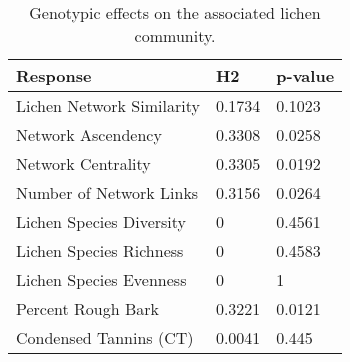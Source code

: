 \begin{table}[ht]
\centering
\begin{tabular}{lll}
  \hline
Response & H2 & p-value \\ 
  \hline
Lichen Network Similarity & 0.1734 & 0.1023 \\ 
  Network Ascendency & 0.3308 & 0.0258 \\ 
  Network Centrality & 0.3305 & 0.0192 \\ 
  Number of Network Links & 0.3156 & 0.0264 \\ 
  Lichen Species Diversity & 0 & 0.4561 \\ 
  Lichen Species Richness & 0 & 0.4583 \\ 
  Lichen Species Evenness & 0 & 1 \\ 
  Percent Rough Bark & 0.3221 & 0.0121 \\ 
  Condensed Tannins (CT) & 0.0041 & 0.445 \\ 
   \hline
\end{tabular}
\caption{Genotypic effects on the associated lichen community.} 
\label{tab:h2_table}
\end{table}
